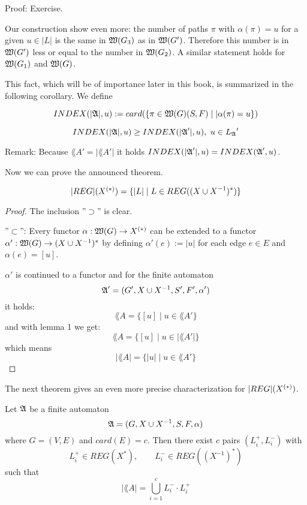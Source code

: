 Proof: Exercise.

Our construction show even more: the number of paths $\pi$ with $\alpha(\pi) =
u$ for a given $u \in |L|$ is the same in $\mbox{$\mathfrak{W}(G_3)$}$ as in $\mbox{$\mathfrak{W}(G')$}$.
Therefore this number is in $\mbox{$\mathfrak{W}(G')$}$ less or equal to the number in
$\mbox{$\mathfrak{W}(G_2)$}$. A similar statement holds for $\mbox{$\mathfrak{W}(G_1)$}$ and
$\mbox{$\mathfrak{W}(G)$}$.

This fact, which will be of importance later in this book, is summarized in the
following corollary. We define

\begin{definition}
\[ INDEX(|\mbox{$\mathfrak{A}$}|, u) := card( \{ \pi \in \mbox{$\mathfrak{W}(G)$}(S, F) \mid |\alpha(\pi) =
u \} ) \]
\end{definition}

\begin{corollary}
\[ INDEX(|\mbox{$\mathfrak{A}$}|, u) \geq INDEX(|\mbox{$\mathfrak{A}$}'|, u),\ u \in \mbox{$L_{\mathfrak{A}}$}' \]
\end{corollary}

Remark: Because $\lang{A}' = |\lang{A}'|$ it holds $INDEX(|\mbox{$\mathfrak{A}$}'|, u) =
INDEX(\mbox{$\mathfrak{A}$}', u)$.

Now we can prove the announced theorem.

\begin{theorem}
\[ |REG|(\mbox{${X}^{(*)}$}) = \{ |L| \mid L \in REG((X\cup X^{-1})^*) \} \]
\end{theorem}

\begin{proof}
 The inclusion ''$\supset$'' is clear.
 
 ''$\subset$'': Every functor $\alpha : \mbox{$\mathfrak{W}(G)$} \to \mbox{${X}^{(*)}$}$ can be
 extended to a functor $\alpha' : \mbox{$\mathfrak{W}(G)$} \to (X \cup X^{-1})^*$ by
 defining $\alpha'(e) := |u|$ for each edge $e \in E$ and $\alpha(e) = [u]$.
 
 $\alpha'$ is continued to a functor and for the finite automaton
 \[ \mbox{$\mathfrak{A}$}' = (G', X \cup X^{-1}, S', F', \alpha') \]
 it holds:
 \[ \lang{A} = \{ [u] \mid u \in \lang{A}' \} \]
 and with lemma 1 we get:
 \[ \lang{A} = \{ [u] \mid u \in |\lang{A}'| \} \]
 which means
 \[ |\lang{A}| = \{ |u| \mid u \in \lang{A}' \} \]
\end{proof}

The next theorem gives an even more precise characterization for
$|REG|(\mbox{${X}^{(*)}$})$.

\begin{theorem}
Let $\mbox{$\mathfrak{A}$}$ be a finite automaton
\[ \mbox{$\mathfrak{A}$} = (G, X \cup X^{-1}, S, F, \alpha) \]
where $G = (V, E)$ and $card(E) = c$. Then there exist $c$ pairs $(L_i^+,
L_i^-)$ with 
\[ L_i^+ \in REG(X^*),\qquad L_i^- \in REG((X^{-1})^*) \]
such that
\[ |\lang{A}| = \bigcup_{i=1}^c L_i^- \cdot L_i^+ \]
\end{theorem}

